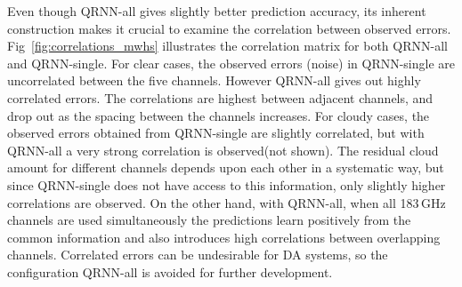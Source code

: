 \documentclass[amt]{copernicus}
\begin{document}
Even though QRNN-all gives slightly better prediction accuracy, its inherent construction makes it crucial to examine the correlation between observed errors. Fig~\ref{fig:correlations_mwhs} illustrates the correlation matrix for both QRNN-all and QRNN-single. For clear cases, the observed errors (noise) in QRNN-single are uncorrelated between the five channels. However QRNN-all gives out highly correlated errors. The correlations are highest between adjacent channels, and drop out as the spacing between the channels increases. For cloudy cases, the observed errors obtained from QRNN-single are slightly correlated, but with QRNN-all a very strong correlation is observed(not shown). The residual cloud amount for different channels depends upon each other in a systematic way, but since QRNN-single does not have access to this information, only slightly higher correlations are observed. On the other hand, with QRNN-all, when all 183\,GHz channels are used simultaneously the predictions learn positively from the common information and also introduces high correlations between overlapping channels. Correlated errors can be undesirable for DA systems, so the configuration QRNN-all is avoided for further development.
\end{document}

